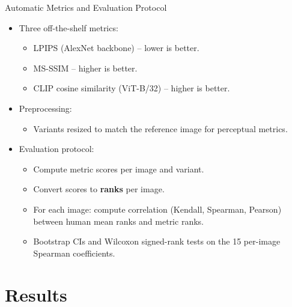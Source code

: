 \documentclass[aspectratio=169]{beamer}
\begin{document}
\begin{frame}{Automatic Metrics and Evaluation Protocol}
  \begin{itemize}
    \item Three off-the-shelf metrics:
      \begin{itemize}
        \item LPIPS (AlexNet backbone) -- lower is better.
        \item MS-SSIM -- higher is better.
        \item CLIP cosine similarity (ViT-B/32) -- higher is better.
      \end{itemize}
    \item Preprocessing:
      \begin{itemize}
        \item Variants resized to match the reference image
              for perceptual metrics.
      \end{itemize}
    \item Evaluation protocol:
      \begin{itemize}
        \item Compute metric scores per image and variant.
        \item Convert scores to \textbf{ranks} per image.
        \item For each image: compute correlation (Kendall, Spearman,
              Pearson) between human mean ranks and metric ranks.
        \item Bootstrap CIs and Wilcoxon signed-rank tests on the
              15 per-image Spearman coefficients.
      \end{itemize}
  \end{itemize}
\end{frame}

\section{Results}
\end{document}
